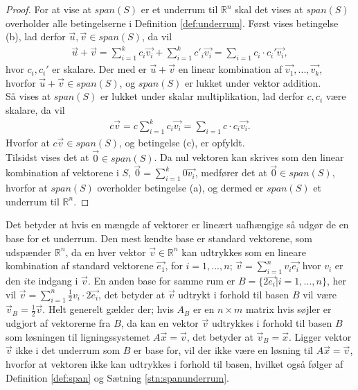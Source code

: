 \begin{proof}
For at vise at $span(S)$ er et underrum til $\mathds{R}^n$ skal det vises at $span(S)$ overholder alle betingelserne i Definition \ref{def:underrum}.
Først vises betingelse (b), lad  derfor $\vec{u}, \vec{v} \in span(S)$, da vil 
\begin{align*}
\vec{u}+\vec{v}= \sum_{i=1}^k c_i \vec{v_i} + \sum_{i=1}^k c'_i \vec{v_i} = \sum_{i=1} c_i\cdot c_i' \vec{v_i},
\end{align*}
hvor $c_i, c_i'$ er skalare.
Der med er $\vec{u}+\vec{v}$ en linear kombination af $\vec{v_1},...,\vec{v_k}$, hvorfor $\vec{u}+\vec{v} \in span(S)$, og $span(S)$ er lukket under vektor addition.
\\ Så vises at $span(S)$ er lukket under skalar multiplikation, lad derfor $c, c_i$ være skalare, da vil
\begin{align*}
c\vec{v}= c\sum_{i=1}^k c_i \vec{v_i}  = \sum_{i=1} c \cdot c_i \vec{v_i}.
\end{align*}
Hvorfor at $c\vec{v} \in span(S)$, og betingelse (c), er opfyldt.
\\Tilsidst vises det at $\vec{0} \in span(S)$.
Da nul vektoren kan skrives som den linear kombination af vektorene i $S$, $\vec{0} = \sum_{i=1}^k 0 \vec{v_i}$, medfører det at $\vec{0} \in span(S)$, hvorfor at $span(S)$ overholder betingelse (a), og dermed er $span(S)$ et underrum til $\mathds{R}^n$.
\end{proof}
Det betyder at hvis en mængde af vektorer er lineært uafhængige så udgør de en base for et underrum. 
Den mest kendte base er standard vektorene, som udspænder $\mathds{R}^n$, da en hver vektor $\vec{v} \in \mathds{R}^n$ kan udtrykkes som en lineare kombination af standard vektorene $\vec{e_1}$, for $i = 1,..., n$; $\vec{v}= \sum_{i=1}^n v_i \vec{e_i}$ hvor $v_i$ er den $i$te indgang i $\vec{v}$.
En anden base for samme rum er $B=\{2\vec{e_i}| i =1,...,n\}$, her vil $\vec{v} = \sum_{i=1}^n \frac{1}{2} v_i \cdot 2\vec{e_i}$, det betyder at $\vec{v}$ udtrykt i forhold til basen $B$ vil være $\vec{v}_B = \frac{1}{2}\vec{v}$.
Helt generelt gælder der; hvis $A_B$ er en $n \times m$ matrix hvis søjler er udgjort af vektorerne fra $B$, da kan en vektor $\vec{v}$ udtrykkes i forhold til basen $B$ som løsningen til ligningssystemet $A \vec{x} =\vec{v}$, det betyder at $\vec{v}_B =  \vec{x}$. 
Ligger vektor $\vec{v}$ ikke i det underrum som $B$ er base for, vil der ikke være en løsning til $A \vec{x} =\vec{v}$, hvorfor at vektoren ikke kan udtrykkes i forhold til basen, hvilket også følger af Definition \ref{def:span} og Sætning \ref{stn:spanunderrum}.
